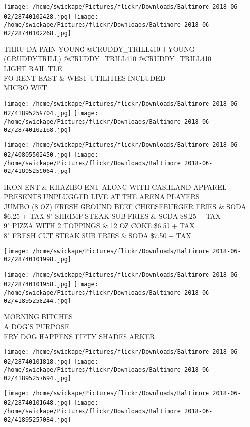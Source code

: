 \documentclass[10pt,letterpaper]{article}
\begin{document}
\texttt{[image: /home/swickape/Pictures/flickr/Downloads/Baltimore 2018-06-02/28740102428.jpg]}
\texttt{[image: /home/swickape/Pictures/flickr/Downloads/Baltimore 2018-06-02/28740102268.jpg]}

THRU DA PAIN YOUNG @CRUDDY\_TRILL410 J{-}YOUNG (CRUDDYTRILL) @CRUDDY\_TRILL410 @CRUDDY\_TRILL410\\
LIGHT RAIL TLE\\
FO RENT EAST \& WEST UTILITIES INCLUDED\\
MICRO WET
\pagebreak

\texttt{[image: /home/swickape/Pictures/flickr/Downloads/Baltimore 2018-06-02/41895259704.jpg]}
\texttt{[image: /home/swickape/Pictures/flickr/Downloads/Baltimore 2018-06-02/28740102168.jpg]}

\texttt{[image: /home/swickape/Pictures/flickr/Downloads/Baltimore 2018-06-02/40805502450.jpg]}
\texttt{[image: /home/swickape/Pictures/flickr/Downloads/Baltimore 2018-06-02/41895259064.jpg]}

IKON ENT \& KHAZIBO ENT ALONG WITH CASHLAND APPAREL PRESENTS UNPLUGGED LIVE AT THE ARENA PLAYERS\\
JUMBO (8 OZ) FRESH GROUND BEEF CHEESEBURGER FRIES \& SODA \$6.25 + TAX 8" SHRIMP STEAK SUB FRIES \& SODA \$8.25 + TAX\\
9" PIZZA WITH 2 TOPPINGS \& 12 OZ COKE \$6.50 + TAX\\
8" FRESH CUT STEAK SUB FRIES \& SODA \$7.50 + TAX
\pagebreak

\texttt{[image: /home/swickape/Pictures/flickr/Downloads/Baltimore 2018-06-02/28740101998.jpg]}

\vspace{0.25in}
\texttt{[image: /home/swickape/Pictures/flickr/Downloads/Baltimore 2018-06-02/28740101958.jpg]}
\texttt{[image: /home/swickape/Pictures/flickr/Downloads/Baltimore 2018-06-02/41895258244.jpg]}

MORNING BITCHES\\
A DOG'S PURPOSE\\
ERY DOG HAPPENS FIFTY SHADES ARKER
\pagebreak

\texttt{[image: /home/swickape/Pictures/flickr/Downloads/Baltimore 2018-06-02/28740101818.jpg]}
\texttt{[image: /home/swickape/Pictures/flickr/Downloads/Baltimore 2018-06-02/41895257694.jpg]}

\texttt{[image: /home/swickape/Pictures/flickr/Downloads/Baltimore 2018-06-02/28740101648.jpg]}
\texttt{[image: /home/swickape/Pictures/flickr/Downloads/Baltimore 2018-06-02/41895257084.jpg]}
\end{document}
